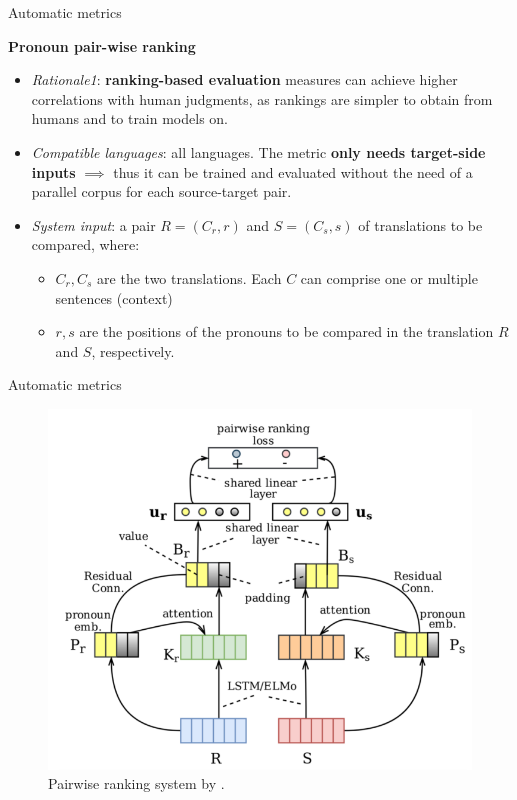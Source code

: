 \begin{frame}{Automatic metrics}
	
\textbf{Pronoun pair-wise ranking} \cite{jwalapuram_evaluating_2019}

\begin{itemize}
	\item \textit{Rationale1}: \textbf{ranking-based evaluation} measures can achieve higher correlations with human judgments, as rankings are simpler to obtain from humans and to train models on.
	\item \textit{Compatible languages}: all languages. The metric \textbf{only needs target-side inputs} $\implies$ thus it can be trained and evaluated without the need of a parallel corpus for each source-target pair.
	\item \textit{System input}: a pair $R=(C_r, r)$ and $S=(C_s, s)$ of translations to be compared, where:
	\begin{itemize}
		\item $C_r,C_s$ are the two translations. Each $C$ can comprise one or multiple sentences (context)
		\item $r,s$ are the positions of the pronouns to be compared in the translation $R$ and $S$, respectively.
	\end{itemize} 
\end{itemize}
	
\end{frame}


\begin{frame}{Automatic metrics}
	
\begin{figure}
	\centering
	\includegraphics[width=0.55\linewidth]{Images/jwalapuram_2019_pronoun_ranker}
	\caption{Pairwise ranking system by \cite{jwalapuram_evaluating_2019}.}
	\label{fig:jwalapuram2019pronounranker}
\end{figure}

\end{frame}


